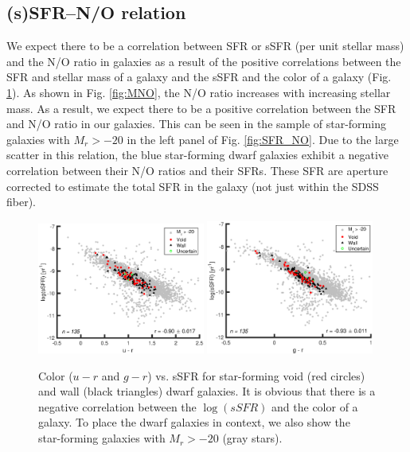 \subsection{(s)SFR--N/O relation}

We expect there to be a correlation between SFR or sSFR (per unit stellar mass) 
and the N/O ratio in galaxies as a result of the positive correlations between 
the SFR and stellar mass of a galaxy \citep{Brinchmann04} and the sSFR and the 
color of a galaxy (Fig. \ref{fig:color_sSFR}).  As shown in Fig. \ref{fig:MNO}, 
the N/O ratio increases with increasing stellar mass.  As a result, we expect 
there to be a positive correlation between the SFR and N/O ratio in our 
galaxies.  This can be seen in the sample of star-forming galaxies with 
$M_r > -20$ in the left panel of Fig. \ref{fig:SFR_NO}.  Due to the large 
scatter in this relation, the blue star-forming dwarf galaxies exhibit a 
negative correlation between their N/O ratios and their SFRs.  These SFR are 
aperture corrected to estimate the total SFR in the galaxy (not just within the 
SDSS fiber).

\begin{figure}
    \includegraphics[width=0.49\textwidth]{Images/Paper2/u-r_sSFR_dwarf_0-20_SF_t3}
    \includegraphics[width=0.49\textwidth]{Images/Paper2/g-r_sSFR_dwarf_0-20_SF_t3}
    \caption[Color versus sSFR for 135 dwarf galaxy sample]{Color ($u-r$ and 
    $g-r$) vs. sSFR for star-forming void (red circles) and wall (black 
    triangles) dwarf galaxies.  It is obvious that there is a negative 
    correlation between the $\log (sSFR)$ and the color of a galaxy.  To place 
    the dwarf galaxies in context, we also show the star-forming galaxies with 
    $M_r > -20$ (gray stars).}
    \label{fig:color_sSFR}
\end{figure}

